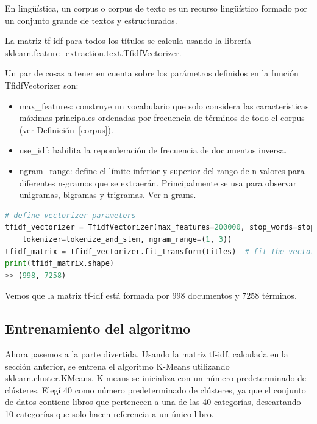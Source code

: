 \documentclass{uimppracticas}
\begin{document}
\begin{definition}\label{corpus}
En lingüística, un corpus o corpus de texto es un recurso lingüístico formado por un conjunto grande de textos y estructurados.
\end{definition}


La matriz tf-idf para todos los títulos se calcula usando la librería \href{https://scikit-learn.org/stable/modules/generated/sklearn.feature_extraction.text.TfidfVectorizer.html}{sklearn.feature\_extraction.text.TfidfVectorizer}. 

Un par de cosas a tener en cuenta sobre los parámetros definidos en la función TfidfVectorizer son:

\begin{itemize}
	\item max\_features: construye un vocabulario que solo considera las características máximas principales ordenadas por frecuencia de términos de todo el corpus (ver Definición~\ref{corpus}).
	\item use\_idf: habilita la reponderación de frecuencia de documentos inversa.
	\item ngram\_range: define el límite inferior y superior del rango de n-valores para diferentes n-gramos que se extraerán. Principalmente se usa para observar unigramas, bigramas y trigramas. Ver \href{https://en.wikipedia.org/wiki/N-gram}{n-grams}.
\end{itemize}

\begin{lstlisting}[language=python]
# define vectorizer parameters
tfidf_vectorizer = TfidfVectorizer(max_features=200000, stop_words=stopwords, use_idf=True,
	tokenizer=tokenize_and_stem, ngram_range=(1, 3))
tfidf_matrix = tfidf_vectorizer.fit_transform(titles)  # fit the vectorizer to titles
print(tfidf_matrix.shape)
>> (998, 7258)
\end{lstlisting}

Vemos que la matriz tf-idf está formada por 998 documentos y 7258 términos.

\subsection{Entrenamiento del algoritmo}

Ahora pasemos a la parte divertida. Usando la matriz tf-idf, calculada en la sección anterior, se entrena el algoritmo K-Means utilizando \href{https://scikit-learn.org/stable/modules/generated/sklearn.cluster.KMeans.html}{sklearn.cluster.KMeans}. K-means se inicializa con un número predeterminado de clústeres. Elegí 40 como número predeterminado de clústeres, ya que el conjunto de datos contiene libros que pertenecen a una de las 40 categorías, descartando 10 categorías que solo hacen referencia a un único libro.
\end{document}
